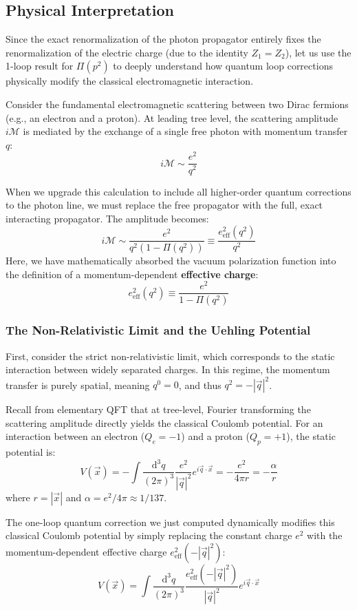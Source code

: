 \subsection{Physical Interpretation}

Since the exact renormalization of the photon propagator entirely fixes the renormalization of the electric charge (due to the identity $Z_1 = Z_2$), let us use the 1-loop result for $\Pi(p^2)$ to deeply understand how quantum loop corrections physically modify the classical electromagnetic interaction.

Consider the fundamental electromagnetic scattering between two Dirac fermions (e.g., an electron and a proton). At leading tree level, the scattering amplitude $i\mathcal{M}$ is mediated by the exchange of a single free photon with momentum transfer $q$:
\[ i\mathcal{M} \sim \frac{e^2}{q^2} \]

When we upgrade this calculation to include all higher-order quantum corrections to the photon line, we must replace the free propagator with the full, exact interacting propagator. The amplitude becomes:
\[ i\mathcal{M} \sim \frac{e^2}{q^2 (1 - \Pi(q^2))} \equiv \frac{e_{\text{eff}}^2(q^2)}{q^2} \]
Here, we have mathematically absorbed the vacuum polarization function into the definition of a momentum-dependent \textbf{effective charge}:
\[ e_{\text{eff}}^2(q^2) \equiv \frac{e^2}{1 - \Pi(q^2)} \]

\subsubsection{The Non-Relativistic Limit and the Uehling Potential}
First, consider the strict non-relativistic limit, which corresponds to the static interaction between widely separated charges. In this regime, the momentum transfer is purely spatial, meaning $q^0 = 0$, and thus $q^2 = -|\vec{q}|^2$.

Recall from elementary QFT that at tree-level, Fourier transforming the scattering amplitude directly yields the classical Coulomb potential. For an interaction between an electron ($Q_e = -1$) and a proton ($Q_p = +1$), the static potential is:
\[ V(\vec{x}) = -\int \frac{\mathrm{d}^3 q}{(2\pi)^3} \frac{e^2}{|\vec{q}|^2} e^{i \vec{q} \cdot \vec{x}} = -\frac{e^2}{4\pi r} = -\frac{\alpha}{r} \]
where $r = |\vec{x}|$ and $\alpha = e^2/4\pi \approx 1/137$.

The one-loop quantum correction we just computed dynamically modifies this classical Coulomb potential by simply replacing the constant charge $e^2$ with the momentum-dependent effective charge $e_{\text{eff}}^2(-|\vec{q}|^2)$:
\[ V(\vec{x}) = \int \frac{\mathrm{d}^3 q}{(2\pi)^3} \frac{e_{\text{eff}}^2(-|\vec{q}|^2)}{|\vec{q}|^2} e^{i \vec{q} \cdot \vec{x}} \]

